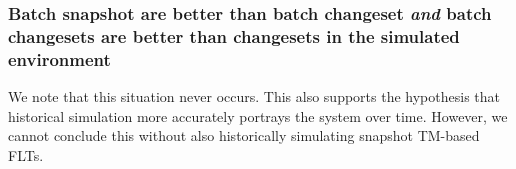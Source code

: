 \subsubsection{Batch snapshot are better than batch changeset
\emph{and} batch changesets are better than changesets in the simulated environment}

%
%
We note that this situation never occurs.  This also supports the hypothesis
that historical simulation more accurately portrays the system over time.
However, we cannot conclude this without also historically simulating snapshot
TM-based FLTs.

